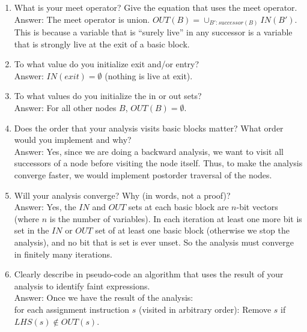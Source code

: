 \begin{enumerate}
\item What is your meet operator? Give the equation that uses the meet operator. \\
Answer: The meet operator is union. $OUT(B) = \cup_{B': successor(B)} IN(B')$. This is because a variable that is ``surely live'' in any successor is a variable that is strongly live at the exit of a basic block. 
\item To what value do you initialize exit and/or entry? \\
Answer: $IN(exit) = \emptyset$ (nothing is live at exit).
\item To what values do you initialize the in or out sets? \\
Answer: For all other nodes $B$, $OUT(B) = \emptyset$.
\item Does the order that your analysis visits basic blocks matter? What order would you implement and why? \\
Answer: Yes, since we are doing a backward analysis, we want to visit all successors of a node before visiting the node itself. Thus, to make the analysis converge faster, we would implement postorder traversal of the nodes. 
\item Will your analysis converge? Why (in words, not a proof)? \\
Answer: Yes, the $IN$ and $OUT$ sets at each basic block are $n$-bit vectors (where $n$ is the number of variables). In each iteration at least one more bit is set in the $IN$ or $OUT$ set of at least one basic block (otherwise we stop the analysis), and no bit that is set is ever unset. So the analysis must converge in finitely many iterations.
\item Clearly describe in pseudo-code an algorithm that uses the result of your analysis to identify faint expressions.\\
Answer: Once we have the result of the analysis:\\
for each assignment instruction $s$ (visited in arbitrary order): Remove $s$ if $LHS(s) \notin OUT(s)$.  
\end{enumerate}
